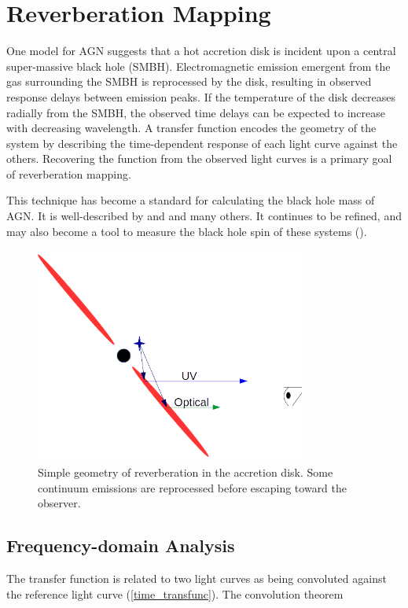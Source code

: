 \documentclass[11pt,letterpaper]{article}
\begin{document}
\section{Reverberation Mapping}
	One model for AGN suggests that a hot accretion disk is incident upon a central super-massive black hole (SMBH). Electromagnetic emission emergent from the gas surrounding the SMBH is reprocessed by the disk, resulting in observed response delays between emission peaks. If the temperature of the disk decreases radially from the SMBH, the observed time delays can be expected to increase with decreasing wavelength. A transfer function encodes the geometry of the system by describing the time-dependent response of each light curve against the others. Recovering the function from the observed light curves is a primary goal of reverberation mapping.

	This technique has become a standard for calculating the black hole mass of AGN. It is well-described by \cite{2007MNRAS.380..669C} and \cite{2014A&ARv..22...72U} and many others. It continues to be refined, and may also become a tool to measure the black hole spin of these systems (\cite{2016arXiv160606736K}).

	\begin{figure}
		\centering
		\includegraphics[width=3.5in]{../img/basic_geometry.png}
		\caption{Simple geometry of reverberation in the accretion disk. Some continuum emissions are reprocessed before escaping toward the observer.}
	\end{figure}

\subsection{Frequency-domain Analysis}

	The transfer function is related to two light curves as being convoluted against the reference light curve (\ref{time_transfunc}). The convolution theorem 
\end{document}
